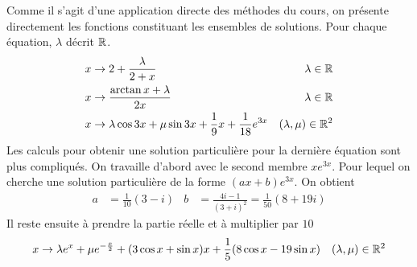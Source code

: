 Comme il s'agit d'une application directe des méthodes du cours, on présente directement les fonctions constituant les ensembles de solutions. Pour chaque équation, $\lambda$ décrit $\mathbb{R}$.
\begin{align}
 x &\rightarrow 2 +\frac{\lambda}{2+x} & \lambda \in \mathbb{R} \\
 x &\rightarrow \frac{\arctan x + \lambda}{2x} & \lambda \in \mathbb{R} \\
 x &\rightarrow \lambda \cos 3x + \mu \sin 3x + \frac{1}{9}x + \frac{1}{18}e^{3x} & (\lambda,\mu) \in \mathbb{R}^2 
\end{align}
Les calculs pour obtenir une solution particulière pour la dernière équation sont plus compliqués. On travaille d'abord avec le second membre $xe^{3x}$. Pour lequel on cherche une solution particulière de la forme $(ax+b)e^{3x}$. On obtient 
\begin{align*}
 a&=\frac{1}{10}(3-i) & b&=\frac{4i-1}{(3+i)^2}=\frac{1}{50}(8+19i)
\end{align*}
Il reste ensuite à prendre la partie réelle et à multiplier par $10$
\begin{align}
 x &\rightarrow \lambda e^x  + \mu e^{-\frac{x}{2}} + (3\cos x +\sin x)x +\frac{1}{5}(8\cos x -19 \sin x)& (\lambda,\mu) \in \mathbb{R}^2 
\end{align}

